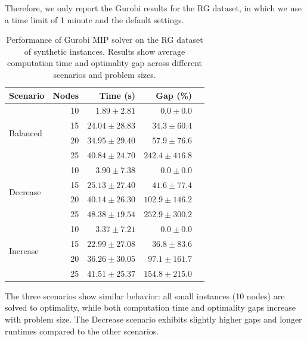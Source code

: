 \documentclass[twocolumn, switch]{article} %
\begin{document}
Therefore, we only report the Gurobi results for the RG dataset, in which we use a time limit of 1 minute and the default settings.

\begin{table}[h]
    \caption{Performance of Gurobi MIP solver on the RG dataset of synthetic instances. Results show average computation time and optimality gap across different scenarios and problem sizes.}
    \label{tab:gurobi_performance}
    \centering
    \begin{tabular}{lrrrr}
        \toprule
        \textbf{Scenario} & \textbf{Nodes} & \textbf{Time (s)} & \textbf{Gap (\%)} \\
        \midrule
        \multirow{4}{*}{Balanced} & 10 & $1.89 \pm 2.81$ & $0.0 \pm 0.0$ \\
        & 15 & $24.04 \pm 28.83$ & $34.3 \pm 60.4$ \\
        & 20 & $34.95 \pm 29.40$ & $57.9 \pm 76.6$ \\
        & 25 & $40.84 \pm 24.70$ & $242.4 \pm 416.8$ \\
        \midrule
        \multirow{4}{*}{Decrease} & 10 & $3.90 \pm 7.38$ & $0.0 \pm 0.0$ \\
        & 15 & $25.13 \pm 27.40$ & $41.6 \pm 77.4$ \\
        & 20 & $40.14 \pm 26.30$ & $102.9 \pm 146.2$ \\
        & 25 & $48.38 \pm 19.54$ & $252.9 \pm 300.2$ \\
        \midrule
        \multirow{4}{*}{Increase} & 10 & $3.37 \pm 7.21$ & $0.0 \pm 0.0$ \\
        & 15 & $22.99 \pm 27.08$ & $36.8 \pm 83.6$ \\
        & 20 & $36.26 \pm 30.05$ & $97.1 \pm 161.7$ \\
        & 25 & $41.51 \pm 25.37$ & $154.8 \pm 215.0$ \\
        \bottomrule
    \end{tabular}
\end{table}

The three scenarios show similar behavior: all small instances (10 nodes) are solved to optimality, while both computation time and optimality gaps increase with problem size.
The Decrease scenario exhibits slightly higher gaps and longer runtimes compared to the other scenarios.
\end{document}
